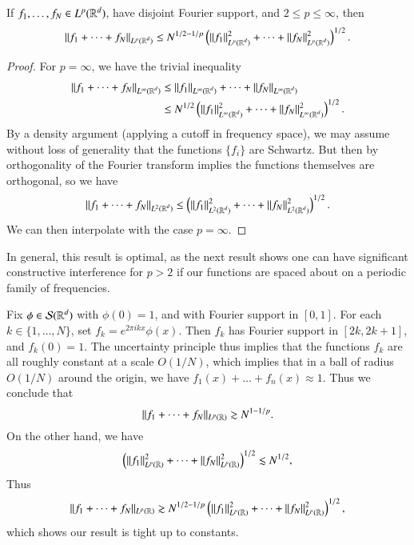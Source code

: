 \begin{theorem}
  If $f_1, \dots, f_N \in L^p(\operatorname{\mathbb{R}}^d)$, have disjoint Fourier support, and $2 \leq p \leq \infty$, then
  \[ \| f_1 + \dots + f_N \|_{L^p(\operatorname{\mathbb{R}}^d)} \leq N^{1/2 - 1/p} \left( \| f_1 \|_{L^p(\operatorname{\mathbb{R}}^d)}^2 + \dots + \| f_N \|_{L^p(\operatorname{\mathbb{R}}^d)}^2 \right)^{1/2}. \]
\end{theorem}
\begin{proof}
  For $p = \infty$, we have the trivial inequality
  \begin{align*}
    \| f_1 + \dots + f_N \|_{L^\infty(\operatorname{\mathbb{R}}^d)} &\leq \| f_1 \|_{L^\infty(\operatorname{\mathbb{R}}^d)} + \dots + \| f_N \|_{L^\infty(\operatorname{\mathbb{R}}^d)}\\
    &\leq N^{1/2} \left( \| f_1 \|_{L^\infty(\operatorname{\mathbb{R}}^d)}^2 + \dots + \| f_N \|_{L^\infty(\operatorname{\mathbb{R}}^d)}^2 \right)^{1/2}.
  \end{align*}
  By a density argument (applying a cutoff in frequency space), we may assume without loss of generality that the functions $\{ f_i \}$ are Schwartz. But then by orthogonality of the Fourier transform implies the functions themselves are orthogonal, so we have
  \[ \| f_1 + \dots + f_N \|_{L^2(\operatorname{\mathbb{R}}^d)} \leq \left( \| f_1 \|_{L^2(\operatorname{\mathbb{R}}^d)}^2 + \dots + \| f_N \|_{L^2(\operatorname{\mathbb{R}}^d)}^2 \right)^{1/2}. \]
  We can then interpolate with the case $p = \infty$.
\end{proof}

In general, this result is optimal, as the next result shows one can have significant constructive interference for $p > 2$ if our functions are spaced about on a periodic family of frequencies.

\begin{example}
  Fix $\phi \in \mathcal{S}(\operatorname{\mathbb{R}}^d)$ with $\phi(0) = 1$, and with Fourier support in $[0,1]$. For each $k \in \{ 1, \dots, N \}$, set $f_k = e^{2 \pi i k x} \phi(x)$. Then $f_k$ has Fourier support in $[2k,2k+1]$, and $f_k(0) = 1$. The uncertainty principle thus implies that the functions $f_k$ are all roughly constant at a scale $O(1/N)$, which implies that in a ball of radius $O(1/N)$ around the origin, we have $f_1(x) + \dots + f_n(x) \approx 1$. Thus we conclude that
  \[ \| f_1 + \dots + f_N \|_{L^p(\operatorname{\mathbb{R}})} \gtrsim N^{1 - 1/p}. \]
  On the other hand, we have
  \[ \left( \| f_1 \|_{L^p(\operatorname{\mathbb{R}})}^2 + \dots + \| f_N \|_{L^p(\operatorname{\mathbb{R}})}^2 \right)^{1/2} \lesssim N^{1/2}, \]
  Thus
  \[ \| f_1 + \dots + f_N \|_{L^p(\operatorname{\mathbb{R}})} \gtrsim N^{1/2 - 1/p} \left( \| f_1 \|_{L^p(\operatorname{\mathbb{R}})}^2 + \dots + \| f_N \|_{L^p(\operatorname{\mathbb{R}})}^2 \right)^{1/2}, \]
  which shows our result is tight up to constants.
\end{example}

